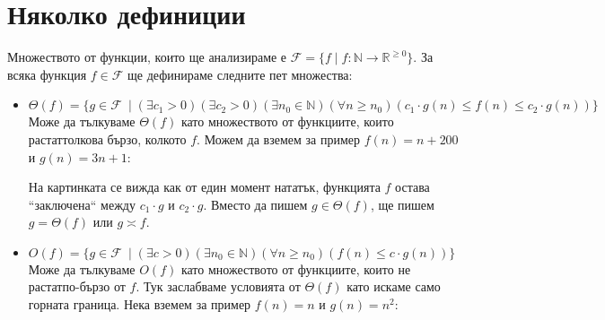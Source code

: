 \documentclass{article}
\newcommand{\N}{\mathbb{N}}
\newcommand{\R}{\mathbb{R}}
\newcommand{\F}{\mathcal{F}}
\theoremstyle{definition}
\theoremstyle{plain}
\theoremstyle{remark}
\theoremstyle{definition}
\begin{document}
\section*{Няколко дефиниции}
Множеството от функции, които ще анализираме е $\F = \{ f \mid f : \N \rightarrow \R^{\geq 0} \}$.
За всяка функция $f \in \F$ ще дефинираме следните пет множества:
\begin{itemize}
  \item $\Theta(f) = \{ g \in \F \: \mid (\exists c_1 > 0)(\exists c_2 > 0)(\exists n_0 \in \N)(\forall n \geq n_0)(c_1 \cdot g(n) \leq f(n) \leq c_2 \cdot g(n))\}$ \\
    Може да тълкуваме $\Theta(f)$ като множеството от функциите, които растат\footnotemark[1] толкова бързо, колкото $f$.
    Можем да вземем за пример $f(n) = n + 200$ и $g(n) = 3n + 1$:


    На картинката се вижда как от един момент нататък, функцията $f$ остава ``заключена`` между $c_1 \cdot g$ и $c_2 \cdot g$.
    Вместо да пишем $g \in \Theta(f)$, ще пишем $g = \Theta(f)$ или $g \asymp f$.
  \item $O(f) = \{ g \in \F \: \mid (\exists c > 0)(\exists n_0 \in \N)(\forall n \geq n_0)(f(n) \leq c \cdot g(n))\}$ \\
    Може да тълкуваме $O(f)$ като множеството от функциите, които не растат\footnotemark[1] по-бързо от $f$.
    Тук заслабваме условията от $\Theta(f)$ като искаме само горната граница.
    Нека вземем за пример $f(n) = n$ и $g(n) = n^2$:



\end{itemize}
\end{document}
